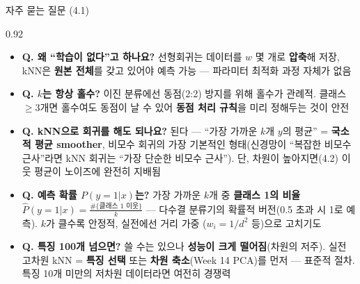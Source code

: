 \begin{frame}{자주 묻는 질문 (4.1)}
\begin{center}\begin{varwidth}{0.92\textwidth}
  \small
  \begin{itemize}
    \item \textbf{Q. 왜 ``학습이 없다''고 하나요?}
      선형회귀는 데이터를 $w$ 몇 개로 \textbf{압축}해 저장,
      kNN은 \textbf{원본 전체}를 갖고 있어야 예측 가능 ---
      파라미터 최적화 과정 자체가 없음
    \item \textbf{Q. $k$는 항상 홀수?}
      이진 분류에선 동점(2:2) 방지를 위해 홀수가 관례적.
      클래스 $\geq 3$개면 홀수여도 동점이 날 수 있어
      \textbf{동점 처리 규칙}을 미리 정해두는 것이 안전
    \item \textbf{Q. kNN으로 회귀를 해도 되나요?}
      된다 --- ``가장 가까운 $k$개 $y$의 평균'' =
      \textbf{국소적 평균 smoother}, 비모수 회귀의 가장
      기본적인 형태(신경망이 ``복잡한 비모수 근사''라면
      kNN 회귀는 ``가장 단순한 비모수 근사'').
      단, 차원이 높아지면(4.2) 이웃 평균이 노이즈에
      완전히 지배됨
    \item \textbf{Q. 예측 확률 $P(y=1|x)$는?}
      가장 가까운 $k$개 중 \textbf{클래스 1의 비율}
      $\hat P(y=1|x) = \frac{\#\{\text{클래스 1 이웃}\}}{k}$
      --- 다수결 분류기의 확률적 버전(0.5 초과 시 1로 예측).
      $k$가 클수록 안정적, 실전에선 거리 가중
      ($w_i = 1/d^2$ 등)으로 고치기도
    \item \textbf{Q. 특징 100개 넘으면?}
      쓸 수는 있으나 \textbf{성능이 크게 떨어짐}(차원의 저주).
      실전 고차원 kNN = \textbf{특징 선택} 또는
      \textbf{차원 축소}(Week 14 PCA)를 먼저 --- 표준적 절차.
      특징 10개 미만의 저차원 데이터라면 여전히 경쟁력
  \end{itemize}
\end{varwidth}\end{center}
\end{frame}

